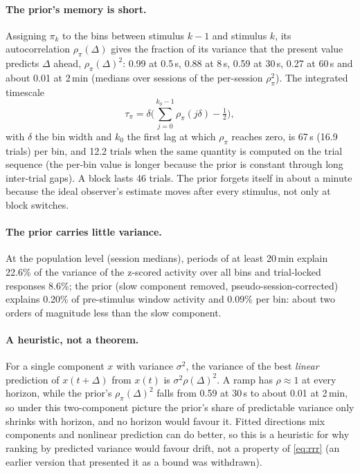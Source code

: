 \documentclass{article}
\begin{document}
\paragraph{The prior's memory is short.} Assigning $\pi_k$ to the bins between stimulus $k-1$ and stimulus $k$, its
autocorrelation $\rho_\pi(\Delta)$ gives the fraction of its variance that the present value predicts $\Delta$ ahead,
$\rho_\pi(\Delta)^2$: 0.99 at 0.5\,s, 0.88 at 8\,s, 0.59 at 30\,s, 0.27 at 60\,s and about 0.01 at 2\,min (medians
over sessions of the per-session $\rho_\pi^2$). The integrated timescale
\begin{equation}
  \tau_\pi = \delta\Big(\sum_{j=0}^{k_0-1} \rho_\pi(j\delta) - \tfrac12\Big) ,
\end{equation}
with $\delta$ the bin width and $k_0$ the first lag at which $\rho_\pi$ reaches zero, is 67\,s (16.9 trials) per bin,
and 12.2 trials when the same quantity is computed on the trial sequence (the per-bin value is longer because the
prior is constant through long inter-trial gaps). A block lasts 46 trials. The prior forgets itself in about a minute
because the ideal observer's estimate moves after every stimulus, not only at block switches.

\paragraph{The prior carries little variance.} At the population level (session medians), periods of at least
20\,min explain 22.6\% of the variance of the z-scored activity over all bins and trial-locked responses 8.6\%; the
prior (slow component removed, pseudo-session-corrected) explains 0.20\% of pre-stimulus window activity and 0.09\% per
bin: about two orders of magnitude less than the slow component.

\paragraph{A heuristic, not a theorem.} For a single component $x$ with variance $\sigma^2$, the variance of the best
\emph{linear} prediction of $x(t+\Delta)$ from $x(t)$ is $\sigma^2 \rho(\Delta)^2$. A ramp has
$\rho \approx 1$ at every horizon, while the prior's $\rho_\pi(\Delta)^2$ falls from 0.59 at 30\,s to about 0.01 at
2\,min, so under this two-component picture the prior's share of predictable variance only shrinks with horizon, and
no horizon would favour it. Fitted directions mix components and nonlinear prediction can do better, so this is a
heuristic for why ranking by predicted variance would favour drift, not a property of \eqref{eq:rrr} (an earlier
version that presented it as a bound was withdrawn).
\end{document}
